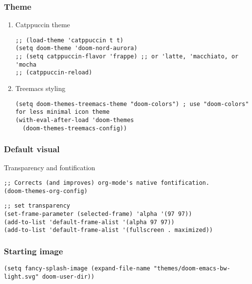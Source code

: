 \documentclass[c]{article}
\theoremstyle{plain}%
\theoremstyle{definition}
\theoremstyle{remark}
\begin{document}
\subsubsection{Theme}
\label{sec:org360630f}
\begin{enumerate}
\item Catppuccin theme
\label{sec:orgadb352d}
\begin{verbatim}
;; (load-theme 'catppuccin t t)
(setq doom-theme 'doom-nord-aurora)
;; (setq catppuccin-flavor 'frappe) ;; or 'latte, 'macchiato, or 'mocha
;; (catppuccin-reload)
\end{verbatim}
\item Treemacs styling
\label{sec:org5c1f505}
\begin{verbatim}
(setq doom-themes-treemacs-theme "doom-colors") ; use "doom-colors" for less minimal icon theme
(with-eval-after-load 'doom-themes
  (doom-themes-treemacs-config))
\end{verbatim}
\end{enumerate}
\subsubsection{Default visual}
\label{sec:orgd3fe660}
Transparency and fontification
\begin{verbatim}
;; Corrects (and improves) org-mode's native fontification.
(doom-themes-org-config)
\end{verbatim}
\begin{verbatim}
;; set transparency
(set-frame-parameter (selected-frame) 'alpha '(97 97))
(add-to-list 'default-frame-alist '(alpha 97 97))
(add-to-list 'default-frame-alist '(fullscreen . maximized))
\end{verbatim}
\subsubsection{Starting image}
\label{sec:org2e3d834}
\begin{verbatim}
(setq fancy-splash-image (expand-file-name "themes/doom-emacs-bw-light.svg" doom-user-dir))
\end{verbatim}
\end{document}
